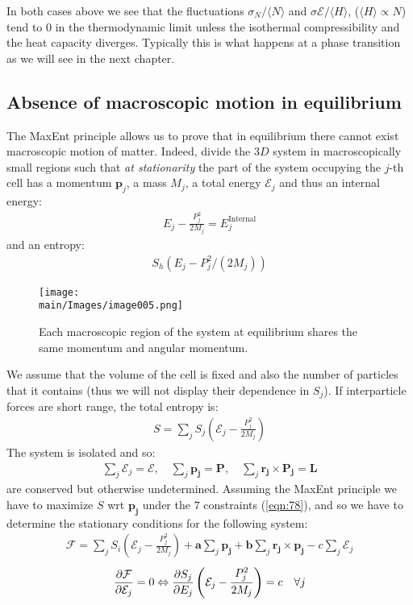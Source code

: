 \documentclass[../../main.tex]{subfiles}
\begin{document}
In both cases above we see that the fluctuations $\sigma_N/\langle N \rangle$ and $\sigma \mathcal{E}/\langle H \rangle$, ($\langle H \rangle \propto N$) tend to $0$ in the thermodynamic limit unless the isothermal compressibility and the heat capacity diverges. Typically this is what happens at a phase transition as we will see in the next chapter.

\subsection{Absence of macroscopic motion in equilibrium}
The MaxEnt principle allows us to prove that in equilibrium there cannot exist macroscopic motion of matter. Indeed, divide the $3D$ system in macroscopically small regions such that \textit{at stationarity} the part of the system occupying the $j$-th cell has a momentum $\bm{p}_j$, a mass $M_j$, a total energy $\mathcal{E}_j$ and thus an internal energy:
\begin{align*}
    E_j - \frac{P_j^2}{2 M_j} = E_j^{\mathrm{Internal}} 
\end{align*} 
and an entropy:
\begin{align*}
    S_h(E_j - P_j^2/(2M_j))
\end{align*}

\begin{figure}[H]
    \centering
    \texttt{[image: \\main/Images/image005.png]}
    \caption{Each macroscopic region of the system at equilibrium shares the same momentum and angular momentum.\label{fig:macmov}}
\end{figure}

We assume that the volume of the cell is fixed and also the number of particles that it contains (thus we will not display their dependence in $S_j$). If interparticle forces are short range, the total entropy is:
\begin{align}\label{eqn:77}
    S = \sum_j S_j\left(\mathcal{E}_j - \frac{P_j^2}{2 M_j} \right)
\end{align}
The system is isolated and so:
\begin{align}\label{eqn:78}
    \sum_j \mathcal{E}_j = \mathcal{E}, \quad \sum_j \bm{p_j} = \bm{P}, \quad \sum_j \bm{r_j} \times \bm{P_j} = \bm{L}
\end{align}
are conserved but otherwise undetermined. Assuming the MaxEnt principle we have to maximize $S$ wrt $\bm{p_j}$ under the $7$ constraints (\ref{eqn:78}), and so we have to determine the stationary conditions for the following system:
\begin{align*}
    \mathcal{F} = \sum_j S_i \left(\mathcal{E}_j - \frac{P_j^2}{2 M_j} \right) + \bm{a} \sum_j \bm{p_j} + \bm{b} \sum_j \bm{r_j} \times \bm{p_j} - c \sum_j \mathcal{E}_j
\end{align*}
\begin{align}\label{eqn:79}
    \pdv{\mathcal{F}}{\mathcal{E}_j} = 0 \Leftrightarrow \pdv{S_j}{E_j} \left(\mathcal{E}_j - \frac{P_j^2}{2M_j} \right) = c \quad \forall j
\end{align}
\end{document}

